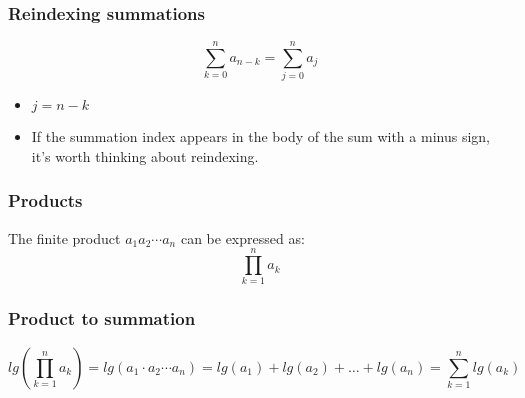     \subsubsection{Reindexing summations}
        \begin{intuition}
            \begin{equation}
                \sum_{k=0}^{n} a_{n-k} = \sum_{j=0}^{n} a_j 
            \end{equation}
            \begin{itemize}
                \item $j = n-k$
            \end{itemize}

            \begin{itemize}
                \item If the summation index appears in the body of the sum with a minus sign, it's worth thinking about reindexing.
            \end{itemize}
        \end{intuition}

    \subsubsection{Products}
        \begin{definition}
            The finite product $a_1 a_2 \cdots a_n$ can be expressed as: 
            \begin{equation}
                \prod_{k=1}^{n} a_k
            \end{equation}
        \end{definition}

    \subsubsection{Product to summation}
        \begin{definition}
            \begin{equation}
                lg \left( \prod_{k=1}^{n} a_k \right) = lg \left( a_1 \cdot a_2 \cdots a_n \right) = lg(a_1) + lg(a_2) + \ldots + lg(a_n) = \sum_{k=1}^{n} lg(a_k)
            \end{equation}
        \end{definition}

